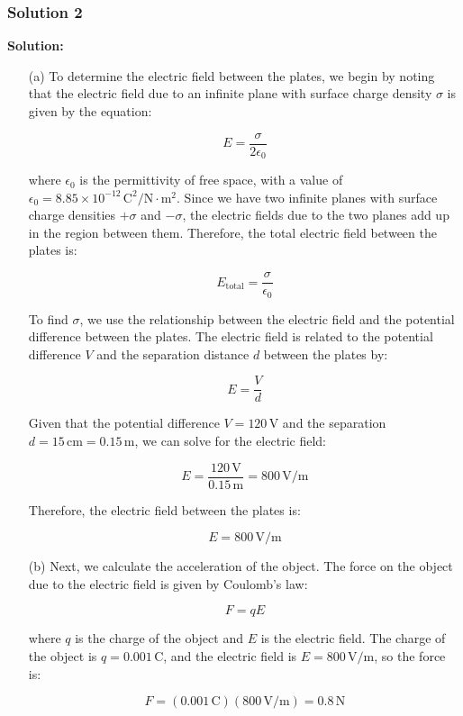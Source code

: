 \documentclass{article}
\begin{document}
\subsubsection{Solution 2}
\textbf{Solution:}

\begin{enumerate}
    \item[(a)] To determine the electric field between the plates, we begin by noting that the electric field due to an infinite plane with surface charge density $\sigma$ is given by the equation:

    \[
    E = \frac{\sigma}{2\epsilon_0}
    \]
    
    where $\epsilon_0$ is the permittivity of free space, with a value of $\epsilon_0 = 8.85 \times 10^{-12} \, \text{C}^2/\text{N} \cdot \text{m}^2$. Since we have two infinite planes with surface charge densities $+\sigma$ and $-\sigma$, the electric fields due to the two planes add up in the region between them. Therefore, the total electric field between the plates is:

    \[
    E_{\text{total}} = \frac{\sigma}{\epsilon_0}
    \]

    To find $\sigma$, we use the relationship between the electric field and the potential difference between the plates. The electric field is related to the potential difference $V$ and the separation distance $d$ between the plates by:

    \[
    E = \frac{V}{d}
    \]

    Given that the potential difference $V = 120 \, \text{V}$ and the separation $d = 15 \, \text{cm} = 0.15 \, \text{m}$, we can solve for the electric field:

    \[
    E = \frac{120 \, \text{V}}{0.15 \, \text{m}} = 800 \, \text{V/m}
    \]

    Therefore, the electric field between the plates is:

    \[
    E = 800 \, \text{V/m}
    \]

    \item[(b)] Next, we calculate the acceleration of the object. The force on the object due to the electric field is given by Coulomb’s law:

    \[
    F = qE
    \]

    where $q$ is the charge of the object and $E$ is the electric field. The charge of the object is $q = 0.001 \, \text{C}$, and the electric field is $E = 800 \, \text{V/m}$, so the force is:

    \[
    F = (0.001 \, \text{C})(800 \, \text{V/m}) = 0.8 \, \text{N}
    \]


\end{enumerate}
\end{document}
